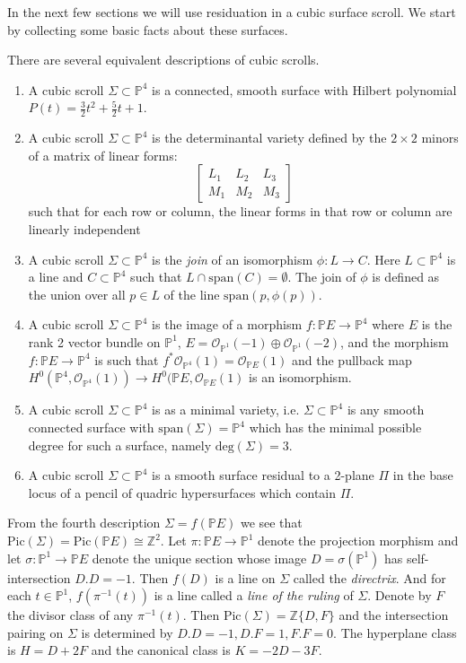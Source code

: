 \documentclass[amssymb,twoside,12 pt,amscd,reqno]{amsart}
\theoremstyle{plain}
\theoremstyle{definition}
\newcommand{\ZZ}{\mathbb{Z}}
\newcommand{\PP}{\mathbb{P}}
\def\ps{\vspace{4pt}}
\newcommand{\lt}{\left}
\newcommand{\rt}{\right}
\newcommand{\OO}{\mathcal O}
\begin{document}
In the next few sections we will use residuation in a cubic surface
scroll. We start by collecting 
some basic facts about these surfaces.

\ps

There are several equivalent descriptions of cubic scrolls.  
\begin{enumerate}
\item A cubic scroll $\Sigma \subset \PP^4$ is a connected, smooth
surface with Hilbert polynomial $P(t) = \frac{3}{2}t^2 + \frac{5}{2}t
+ 1$. 
\item A cubic scroll $\Sigma\subset
\PP^4$ is the determinantal variety defined by the $2\times 2$ minors of 
a matrix of linear forms:
\begin{equation}\lt[ \begin{array} {ccc}
 L_1 & L_2 & L_3 \\
 M_1 & M_2 & M_3 
\end{array} \rt]\end{equation}
such that for each row or column, the linear forms in
that row or column are linearly independent 
\item A cubic scroll $\Sigma\subset \PP^4$ is the \emph{join} of an
isomorphism $\phi:L\rightarrow C$.  Here $L\subset \PP^4$ is a line and
$C\subset \PP^4$ such that $L\cap
\text{span}(C) =\emptyset$.  The join of $\phi$ is defined as the
union over all $p\in L$ of the line $\text{span}(p,\phi(p))$.  
\item A cubic scroll $\Sigma\subset \PP^4$ is the image of a morphism $f:\PP
E\rightarrow \PP^4$ where $E$ is the rank 2 vector bundle on $\PP^1$, 
$E=\OO_{\PP^1}(-1)\oplus \OO_{\PP^1}(-2)$, and the morphism $f:\PP
E\rightarrow \PP^4$ is such that $f^*\OO_{\PP^4}(1) = \OO_{\PP E}(1)$
and the pullback map $H^0(\PP^4,\OO_{\PP^4}(1))\rightarrow H^0(\PP
E,\OO_{\PP E}(1)$ is an isomorphism.
\item A cubic scroll $\Sigma\subset \PP^4$ is as
a minimal variety, i.e. $\Sigma\subset \PP^4$ is any smooth connected 
surface with $\text{span}(\Sigma)=\PP^4$ which has the minimal
possible degree for such a surface, namely $\text{deg}(\Sigma)=3$. 
\item A cubic scroll $\Sigma\subset \PP^4$ is a smooth surface residual to a
2-plane $\Pi$ in the base locus of a pencil of quadric hypersurfaces
which contain $\Pi$.  
\end{enumerate}

\ps

From the fourth description $\Sigma = f(\PP E)$ we see that
$\text{Pic}(\Sigma) = \text{Pic}(\PP E) \cong \ZZ^2$.  Let $\pi:\PP
E\rightarrow \PP^1$ denote the projection morphism and let
$\sigma:\PP^1\rightarrow \PP E$ denote the unique section whose image
$D=\sigma(\PP^1)$ has self-intersection $D.D=-1$.  Then $f(D)$ is a
line on $\Sigma$ called the \emph{directrix}.  And for each $t\in
\PP^1$, $f(\pi^{-1}(t))$ is a line called a \emph{line of the ruling} of
$\Sigma$.  Denote by $F$ the divisor class of any $\pi^{-1}(t)$.  Then
$\text{Pic}(\Sigma) = \ZZ\{D,F\}$ and the intersection pairing on
$\Sigma$ is determined by $D.D = -1, D.F =1, F.F =0$.  The hyperplane
class is $H=D+2F$ and the canonical class is $K = -2D-3F$.  
\end{document}

